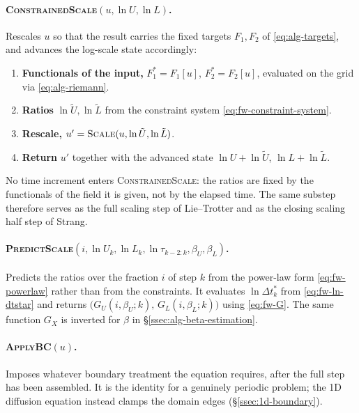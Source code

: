 \paragraph{\textsc{ConstrainedScale}$(u, \ln U, \ln L)$.}
Rescales $u$ so that the result carries the fixed targets $F_1, F_2$ of
\eqref{eq:alg-targets}, and advances the log-scale state accordingly:
\begin{enumerate}
  \item \textbf{Functionals of the input,} $F_1^* = F_1[u]$, $F_2^* = F_2[u]$,
  evaluated on the grid via \eqref{eq:alg-riemann}.
  \item \textbf{Ratios} $\ln \tilde U, \ln \tilde L$ from the constraint system
  \eqref{eq:fw-constraint-system}.
  \item \textbf{Rescale,} $u' = \textsc{Scale}(u, \ln \tilde U, \ln \tilde L)$.
  \item \textbf{Return} $u'$ together with the advanced state
  $\ln U + \ln \tilde U$, $\ln L + \ln \tilde L$.
\end{enumerate}
No time increment enters \textsc{ConstrainedScale}: the ratios are fixed by the
functionals of the field it is given, not by the elapsed time. The same substep
therefore serves as the full scaling step of Lie--Trotter and as the closing
scaling half step of Strang.

\paragraph{\textsc{PredictScale}$(i, \ln U_k, \ln L_k, \ln \tau_{k-2:k}, \beta_U, \beta_L)$.}
Predicts the ratios over the fraction $i$ of step $k$ from the power-law form
\eqref{eq:fw-powerlaw} rather than from the constraints. It evaluates
$\ln \Delta t_k^*$ from \eqref{eq:fw-ln-dtstar} and returns
$\bigl(G_U(i, \beta_U; k),\, G_L(i, \beta_L; k)\bigr)$ using \eqref{eq:fw-G}.
The same function $G_X$ is inverted for $\beta$ in
\S\ref{ssec:alg-beta-estimation}.

\paragraph{\textsc{ApplyBC}$(u)$.}
Imposes whatever boundary treatment the equation requires, after the full step
has been assembled. It is the identity for a genuinely periodic problem; the
1D diffusion equation instead clamps the domain edges
(\S\ref{ssec:1d-boundary}).

